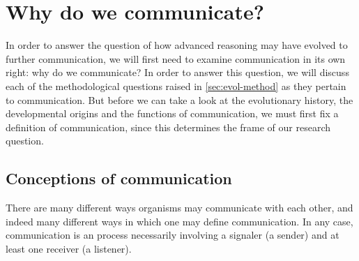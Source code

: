 \chapter{Why do we communicate?}
\label{ch:communication}

In order to answer the question of how advanced reasoning  may have evolved to further communication, we will first need to examine communication in its own right: why do we communicate?
In order to answer this question, we will discuss each of the methodological questions raised in \cref{sec:evol-method} as they pertain to communication. But before we can take a look at the evolutionary history, the developmental origins and the functions of communication, we must first fix a definition of communication, since this determines the frame of our research question.

\section{Conceptions of communication}
\label{sec:comm:definition}


There are many different ways organisms may communicate with each other, and indeed many different ways in which one may define communication. In any case, communication is an process necessarily involving a signaler (a sender) and at least one receiver (a listener).

